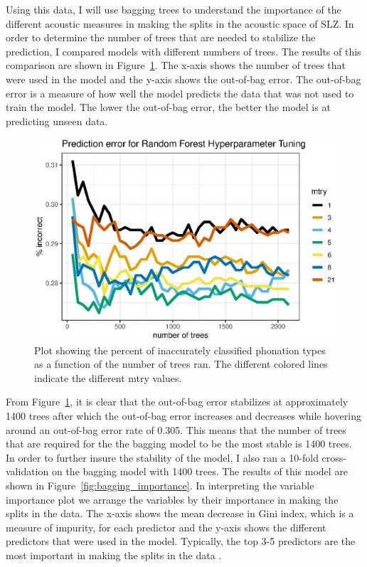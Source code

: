 
Using this data, I will use bagging trees to understand the importance of the different acoustic measures in making the splits in the acoustic space of SLZ. In order to determine the number of trees that are needed to stabilize the prediction, I compared models with different numbers of trees. The results of this comparison are shown in Figure~\ref{fig:bagging_tree}. The x-axis shows the number of trees that were used in the model and the y-axis shows the out-of-bag error. The out-of-bag error is a measure of how well the model predicts the data that was not used to train the model. The lower the out-of-bag error, the better the model is at predicting unseen data.

\begin{figure}[!ht]
    \centering
    \includegraphics[width = 0.9\linewidth]{images/RandomForest/tree_num_dur.eps}
    \caption{Plot showing the percent of inaccurately classified phonation types as a function of the number of trees ran. The different colored lines indicate the different mtry values.}
    \label{fig:bagging_tree}
\end{figure}

From Figure~\ref{fig:bagging_tree}, it is clear that the out-of-bag error stabilizes at approximately 1400 trees after which the out-of-bag error increases and decreases while hovering around an out-of-bag error rate of 0.305. This means that the number of trees that are required for the the bagging model to be the most stable is 1400 trees. In order to further insure the stability of the model, I also ran a 10-fold cross-validation on the bagging model with 1400 trees. The results of this model are shown in Figure~\ref{fig:bagging_importance}. In interpreting the variable importance plot we arrange the variables by their importance in making the splits in the data. The x-axis shows the mean decrease in Gini index, which is a measure of impurity, for each predictor and the y-axis shows the different predictors that were used in the model. Typically, the top 3-5 predictors are the most important in making the splits in the data \citep{boehmkeHandsOnMachineLearning2019}.

